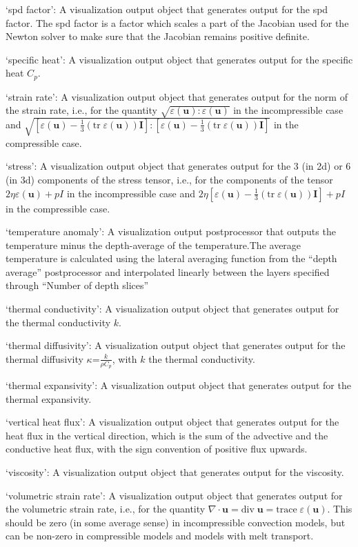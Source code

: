 \begin{itemize}
`spd factor': A visualization output object that generates output for the spd factor. The spd factor is a factor which scales a part of the Jacobian used for the Newton solver to make sure that the Jacobian remains positive definite.

`specific heat': A visualization output object that generates output for the specific heat $C_p$.

`strain rate': A visualization output object that generates output for the norm of the strain rate, i.e., for the quantity $\sqrt{\varepsilon(\mathbf u):\varepsilon(\mathbf u)}$ in the incompressible case and $\sqrt{[\varepsilon(\mathbf u)-\tfrac 13(\textrm{tr}\;\varepsilon(\mathbf u))\mathbf I]:[\varepsilon(\mathbf u)-\tfrac 13(\textrm{tr}\;\varepsilon(\mathbf u))\mathbf I]}$ in the compressible case.

`stress': A visualization output object that generates output for the 3 (in 2d) or 6 (in 3d) components of the stress tensor, i.e., for the components of the tensor $2\eta\varepsilon(\mathbf u)+pI$ in the incompressible case and $2\eta\left[\varepsilon(\mathbf u)-\tfrac 13(\textrm{tr}\;\varepsilon(\mathbf u))\mathbf I\right]+pI$ in the compressible case.

`temperature anomaly': A visualization output postprocessor that outputs the temperature minus the depth-average of the temperature.The average temperature is calculated using the lateral averaging function from the ``depth average'' postprocessor and interpolated linearly between the layers specified through ``Number of depth slices''

`thermal conductivity': A visualization output object that generates output for the thermal conductivity $k$.

`thermal diffusivity': A visualization output object that generates output for the thermal diffusivity $\kappa$=$\frac{k}{\rho C_p}$, with $k$ the thermal conductivity.

`thermal expansivity': A visualization output object that generates output for the thermal expansivity.

`vertical heat flux': A visualization output object that generates output for the heat flux in the vertical direction, which is the sum of the advective and the conductive heat flux, with the sign convention of positive flux upwards.

`viscosity': A visualization output object that generates output for the viscosity.

`volumetric strain rate': A visualization output object that generates output for the volumetric strain rate, i.e., for the quantity $\nabla\cdot\mathbf u = \textrm{div}\; \mathbf u = \textrm{trace}\; \varepsilon(\mathbf u)$. This should be zero (in some average sense) in incompressible convection models, but can be non-zero in compressible models and models with melt transport.



\end{itemize}
